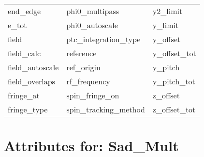 \begin{tabular}{lll}
end_edge                    & phi0_multipass              & y2_limit                    \\
e_tot                       & phi0_autoscale                    & y_limit                     \\
field                       & ptc_integration_type        & y_offset                    \\
field_calc                  & reference                   & y_offset_tot                \\
field_autoscale                & ref_origin                  & y_pitch                     \\
field_overlaps              & rf_frequency                & y_pitch_tot                 \\
fringe_at                   & spin_fringe_on              & z_offset                    \\
fringe_type                 & spin_tracking_method        & z_offset_tot                \\
 \bottomrule
 \end{tabular}
 \vfill
 
 \section{Attributes for: Sad_Mult}
 \label{s:list.sad.mult}
 
